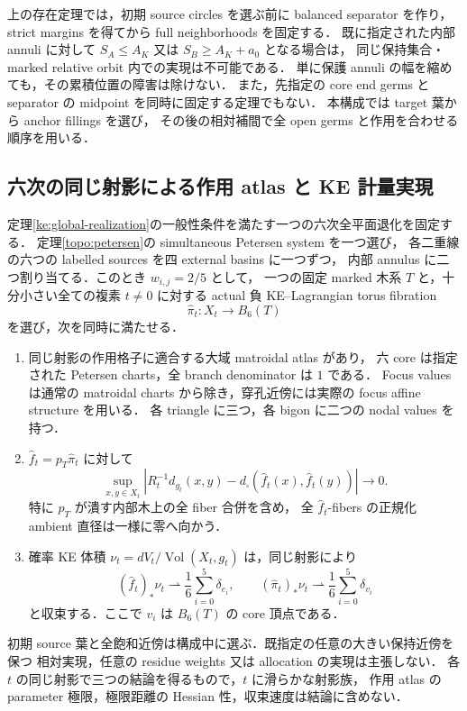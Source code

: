 \begin{remark}
上の存在定理では，初期 source circles を選ぶ前に balanced separator を作り，
strict margins を得てから full neighborhoods を固定する．
既に指定された内部 annuli に対して
$S_A\le A_K$ 又は $S_B\ge A_K+a_0$ となる場合は，
同じ保持集合・marked relative orbit 内での実現は不可能である．
単に保護 annuli の幅を縮めても，その累積位置の障害は除けない．
また，先指定の core end germs と separator の midpoint を同時に固定する定理でもない．
本構成では target 葉から anchor fillings を選び，
その後の相対補間で全 open germs と作用を合わせる順序を用いる．
\end{remark}

\subsection{六次の同じ射影による作用 atlas と KE 計量実現}

\begin{theorem}
\label{ke:sextic-simultaneous-realization}
定理\ref{ke:global-realization}の一般性条件を満たす一つの六次全平面退化を固定する．
定理\ref{topo:petersen}の simultaneous Petersen system を一つ選び，
各二重線の六つの labelled sources を四 external basins に一つずつ，
内部 annulus に二つ割り当てる．このとき $w_{i,j}=2/5$ として，
一つの固定 marked 木系 $T$ と，十分小さい全ての複素 $t\ne0$ に対する
actual 負 KE--Lagrangian torus fibration
\[
 \widehat\pi_t:X_t\longrightarrow B_6(T)
\]
を選び，次を同時に満たせる．
\begin{enumerate}
\item 同じ射影の作用格子に適合する大域 matroidal atlas があり，
六 core は指定された Petersen charts，全 branch denominator は $1$ である．
Focus values は通常の matroidal charts から除き，穿孔近傍には実際の focus affine structure を用いる．
各 triangle に三つ，各 bigon に二つの nodal values を持つ．
\item $\widehat f_t=p_T\widehat\pi_t$ に対して
\begin{equation}\label{ke:eq:sextic-simultaneous-distortion}
 \sup_{x,y\in X_t}
 \left|R_t^{-1}d_{g_t}(x,y)
       -d_\square(\widehat f_t(x),\widehat f_t(y))\right|\longrightarrow0.
\end{equation}
特に $p_T$ が潰す内部木上の全 fiber 合併を含め，
全 $\widehat f_t$-fibers の正規化 ambient 直径は一様に零へ向かう．
\item 確率 KE 体積 $\nu_t=dV_t/\operatorname{Vol}(X_t,g_t)$ は，同じ射影により
\[
 (\widehat f_t)_*\nu_t\rightharpoonup
       \frac16\sum_{i=0}^5\delta_{e_i},\qquad
 (\widehat\pi_t)_*\nu_t\rightharpoonup
       \frac16\sum_{i=0}^5\delta_{v_i}
\]
と収束する．ここで $v_i$ は $B_6(T)$ の core 頂点である．
\end{enumerate}
初期 source 葉と全飽和近傍は構成中に選ぶ．既指定の任意の大きい保持近傍を保つ
相対実現，任意の residue weights 又は allocation の実現は主張しない．
各 $t$ の同じ射影で三つの結論を得るもので，$t$ に滑らかな射影族，
作用 atlas の parameter 極限，極限距離の Hessian 性，収束速度は結論に含めない．
\end{theorem}

